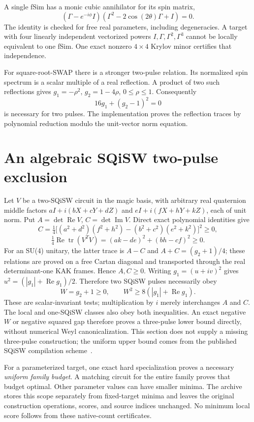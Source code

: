 \documentclass[11pt]{article}
\begin{document}
A single fSim has a monic cubic annihilator for its spin matrix,
\[
 (\Gamma-e^{-i\phi}I)(\Gamma^2-2\cos(2\theta)\Gamma+I)=0.
\]
The identity is checked for free real parameters, including degeneracies.
A target with four linearly independent vectorized powers
$I,\Gamma,\Gamma^2,\Gamma^3$ cannot be locally equivalent to one fSim.
One exact nonzero $4\times4$ Krylov minor certifies that independence.

For square-root-SWAP there is a stronger two-pulse relation. Its normalized
spin spectrum is a scalar multiple of a real reflection. A product of two
such reflections gives $g_1=-\rho^2$, $g_2=1-4\rho$, $0\leq\rho\leq1$.
Consequently
\[
 16g_1+(g_2-1)^2=0
\]
is necessary for two pulses. The implementation proves the reflection traces
by polynomial reduction modulo the unit-vector norm equation.

\section{An algebraic SQiSW two-pulse exclusion}
Let $V$ be a two-SQiSW circuit in the magic basis, with arbitrary real
quaternion middle factors
$aI+i(bX+cY+dZ)$ and $eI+i(fX+hY+kZ)$, each of unit norm.
Put $A=\det\operatorname{Re}V$, $C=\det\operatorname{Im}V$. Direct exact
polynomial identities give
\[
 C=\tfrac14\big[(a^2+d^2)(f^2+h^2)-(b^2+c^2)(e^2+k^2)\big]^2\geq0,
\]
\[
 \tfrac14\operatorname{Re}\operatorname{tr}(V^TV)
 =(ak-de)^2+(bh-cf)^2\geq0.
\]
For an SU(4) unitary, the latter trace is $A-C$ and
$A+C=(g_2+1)/4$; these relations are proved on a free Cartan diagonal and
transported through the real determinant-one KAK frames. Hence $A,C\geq0$.
Writing $g_1=(u+iv)^2$ gives
$u^2=(|g_1|+\operatorname{Re}g_1)/2$. Therefore two SQiSW pulses necessarily obey
\[
 W=g_2+1\geq0,\qquad W^2\geq8(|g_1|+\operatorname{Re}g_1).
\]
These are scalar-invariant tests; multiplication by $i$ merely interchanges
$A$ and $C$. The local and one-SQiSW classes also obey both inequalities.
An exact negative $W$ or negative squared gap therefore proves a three-pulse
lower bound directly, without numerical Weyl canonicalization. This section
does not supply a missing three-pulse construction; the uniform upper bound
comes from the published SQiSW compilation scheme~\cite{sqisw}.

For a parameterized target, one exact hard specialization proves a necessary
\emph{uniform family budget}. A matching circuit for the entire family proves
that budget optimal. Other parameter values can have smaller minima.
The archive stores this scope separately from fixed-target minima and leaves
the original construction operations, scores, and source indices unchanged.
No minimum local score follows from these native-count certificates.
\end{document}
